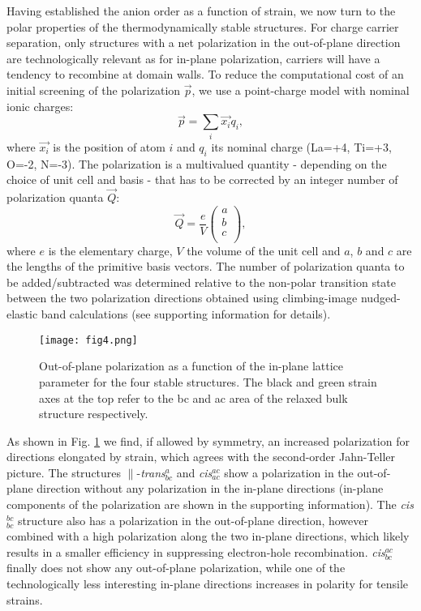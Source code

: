 \documentclass[prl,reprint,aps,twocolumn]{revtex4-1}
\newcommand{\SI}[1]{{#1}}
\begin{document}
Having established the anion order as a function of strain, we now turn to the polar properties of the thermodynamically stable structures. For charge carrier separation, only structures with a net polarization in the out-of-plane direction are technologically relevant as for in-plane polarization, carriers will have a tendency to recombine at domain walls. 
To reduce the computational cost of an initial screening of the polarization $\vec{p}$, we use a point-charge model with nominal ionic charges: 
\begin{equation}
\vec{p}=\sum_{i}\vec{x_i} q_i,
\end{equation}
where $\vec{x_i}$ is the position of atom $i$ and $q_i$ its nominal charge (La=+4, Ti=+3, O=-2, N=-3).
The polarization is a multivalued quantity - depending on the choice of unit cell and basis - that has to be corrected by an integer number
of polarization quanta $\vec{Q}$:
\begin{equation}
\vec{Q}=\frac{e}{V}\begin{pmatrix} a \\ b \\ c \\ \end{pmatrix},
\label{eq:quantum}
\end{equation}
where $e$ is the elementary charge, $V$ the volume of the unit cell and $a$, $b$ and $c$ are the lengths of the primitive basis vectors. The number of polarization quanta to be added/subtracted was determined relative to the non-polar transition state between the two polarization directions obtained using climbing-image nudged-elastic band calculations (see \SI{supporting information} for details). 

\begin{figure}
\centering
  \texttt{[image: fig4.png]}
  \caption{Out-of-plane polarization as a function of the in-plane lattice parameter for the four stable structures. The black and green strain axes at the top refer to the bc and ac area of the relaxed bulk structure respectively.} 
 \label{fig:polarization}
\end{figure}

As shown in Fig. \ref{fig:polarization}
we find, if allowed by symmetry, an increased polarization for directions elongated by strain, which agrees with the second-order Jahn-Teller picture.
 The structures $\parallel$-\textit{trans}$_{bc}^{a}$ and \textit{cis}$^{ac}_{ac}$ show a polarization in the out-of-plane direction without any polarization in the in-plane directions (in-plane components of the polarization are shown in the \SI{supporting information}). The \textit{cis}$^{bc}_{bc}$ structure also has a polarization in 
the out-of-plane direction, however combined with a high polarization along the two in-plane directions, which likely results in a smaller efficiency in 
suppressing electron-hole recombination. \textit{cis}$^{ac}_{bc}$ finally does not show any out-of-plane polarization, while one of the technologically less interesting in-plane directions increases in polarity for tensile strains.
\end{document}
